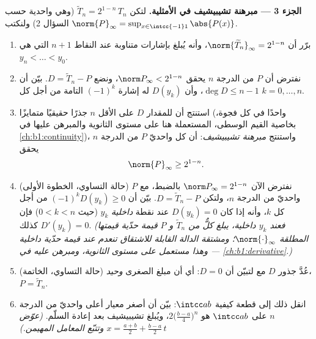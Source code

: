 \begin{problem}
\medskip
\noindent\textbf{الجزء 3 --- مبرهنة تشيبيشيف في الأمثلية.}
لتكن $\widetilde T_n = 2^{1-n}\,T_n$ (وهي واحدية حسب السؤال 2) ولنكتب
$\norm{P}_\infty = \sup_{x \in \intcc{-1}1}\abs{P(x)}$.
\begin{enumerate}[resume]
  \item برّر أن $\norm{\widetilde T_n}_\infty = 2^{1-n}$، وأنه يُبلغ
        بإشارات متناوبة عند النقاط $n + 1$ التي هي $y_n < \dots
        < y_0$.
  \item نفترض أن   $P$ من الدرجة $n$ يحقق
        $\norm P_\infty < 2^{1-n}$، ونضع $D = \widetilde T_n -
        P$. بيّن أن $\deg D \leq n - 1$، وأن $D(y_k)$ له
        إشارة $(-1)^k$ التامة من أجل كل $k = 0, \dots, n$.
  \item استنتج أن للمقدار $D$ على الأقل $n$ جذرًا حقيقيًا متمايزًا (واحدًا
        في كل فجوة، بخاصية القيم الوسطى، المستعملة
        هنا على مستوى الثانوية والمبرهن عليها في
        \cref{ch:b1:continuity})، واستنتج \emph{مبرهنة
        تشيبيشيف}: أن كل  واحديّ $P$ من الدرجة $n$ يحقق
        \[
        \norm{P}_\infty \geq 2^{1-n} .
        \]
  \item (حالة التساوي، الخطوة الأولى) نفترض الآن $\norm P_\infty =
        2^{1-n}$ بالضبط، مع $P$ واحديّ من الدرجة $n$، ولتكن $D =
        \widetilde T_n - P$. بيّن أن $(-1)^kD(y_k) \geq 0$ من أجل
        كل $k$، وأنه إذا كان $D(y_k) = 0$ عند نقطة \emph{داخلية}
        $y_k$ (حيث $0 < k < n$) فإن $D'(y_k) = 0$ كذلك.
        \emph{(فعند $y_k$ داخلية، يبلغ كلٌّ من $\widetilde T_n$ و
        $P$ قيمة حدّية قيمتها المطلقة $\norm{\cdot}
        _\infty$؛ ومشتقة الدالة القابلة للاشتقاق تنعدم
        عند قيمة حدّية داخلية --- وهذا مستعمل على مستوى الثانوية،
        ومبرهن عليه في \cref{ch:b1:derivative}.)}
  \item (حالة التساوي، الخاتمة) عُدَّ جذور $D$ مع
         لتبيّن أن $D = 0$: أي أن مبلغ الصغرى
        \emph{وحيد}، $P = \widetilde T_n$.
  \item انقل ذلك إلى قطعة كيفية $\intcc ab$: بيّن أن
        أصغر معيار أعلى  واحديّ من الدرجة $n$ على
        $\intcc ab$ هو $2\bigl(\frac{b-a}4\bigr)^n$، ويُبلغ 
        تشيبيشيف بعد إعادة السلّم. \emph{(عوّض $x =
        \frac{a+b}2 + \frac{b-a}2\,t$ وتتبّع المعامل
        المهيمن.)}
\end{enumerate}


\end{problem}
